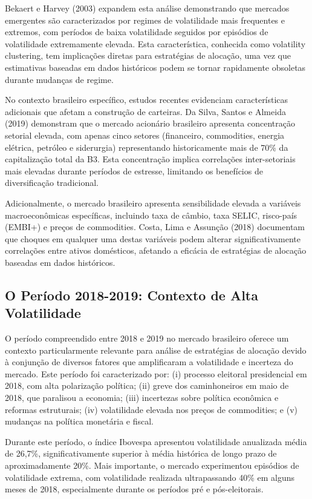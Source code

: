Bekaert e Harvey (2003) expandem esta análise demonstrando que mercados emergentes são caracterizados por regimes de volatilidade mais frequentes e extremos, com períodos de baixa volatilidade seguidos por episódios de volatilidade extremamente elevada. Esta característica, conhecida como volatility clustering, tem implicações diretas para estratégias de alocação, uma vez que estimativas baseadas em dados históricos podem se tornar rapidamente obsoletas durante mudanças de regime.

No contexto brasileiro específico, estudos recentes evidenciam características adicionais que afetam a construção de carteiras. Da Silva, Santos e Almeida (2019) demonstram que o mercado acionário brasileiro apresenta concentração setorial elevada, com apenas cinco setores (financeiro, commodities, energia elétrica, petróleo e siderurgia) representando historicamente mais de 70\% da capitalização total da B3. Esta concentração implica correlações inter-setoriais mais elevadas durante períodos de estresse, limitando os benefícios de diversificação tradicional.

Adicionalmente, o mercado brasileiro apresenta sensibilidade elevada a variáveis macroeconômicas específicas, incluindo taxa de câmbio, taxa SELIC, risco-país (EMBI+) e preços de commodities. Costa, Lima e Assunção (2018) documentam que choques em qualquer uma destas variáveis podem alterar significativamente correlações entre ativos domésticos, afetando a eficácia de estratégias de alocação baseadas em dados históricos.

\subsection{O Período 2018-2019: Contexto de Alta Volatilidade}

O período compreendido entre 2018 e 2019 no mercado brasileiro oferece um contexto particularmente relevante para análise de estratégias de alocação devido à conjunção de diversos fatores que amplificaram a volatilidade e incerteza do mercado. Este período foi caracterizado por: (i) processo eleitoral presidencial em 2018, com alta polarização política; (ii) greve dos caminhoneiros em maio de 2018, que paralisou a economia; (iii) incertezas sobre política econômica e reformas estruturais; (iv) volatilidade elevada nos preços de commodities; e (v) mudanças na política monetária e fiscal.

Durante este período, o índice Ibovespa apresentou volatilidade anualizada média de 26,7\%, significativamente superior à média histórica de longo prazo de aproximadamente 20\%. Mais importante, o mercado experimentou episódios de volatilidade extrema, com volatilidade realizada ultrapassando 40\% em alguns meses de 2018, especialmente durante os períodos pré e pós-eleitorais.

